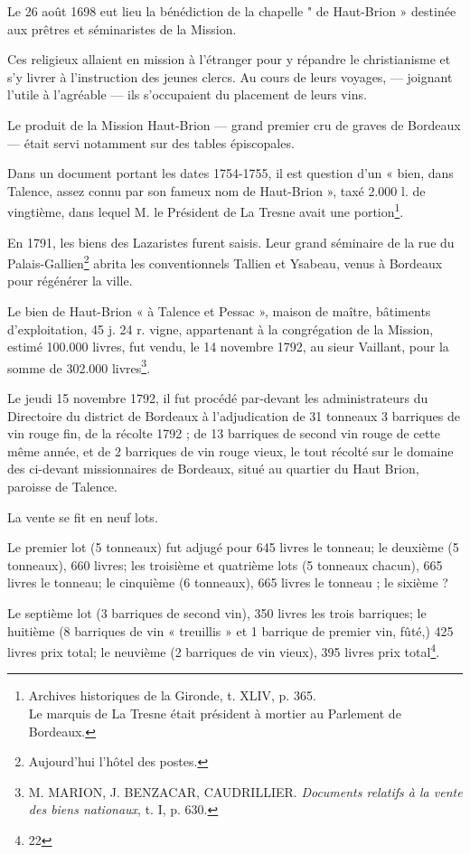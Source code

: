Le 26 août 1698 eut lieu la bénédiction de la chapelle " de Haut-Brion » destinée aux prêtres et séminaristes de la Mission.

Ces religieux allaient en mission à l'étranger pour y répandre le christianisme et s'y livrer à l'instruction des jeunes clercs. Au cours de leurs voyages, — joignant l'utile à l'agréable — ils s'occupaient du placement de leurs vins.

Le produit de la Mission Haut-Brion — grand premier cru de graves de Bordeaux — était servi notamment sur des tables épiscopales.

Dans un document portant les dates 1754-1755, il est question d'un « bien, dans Talence, assez connu par son fameux nom de Haut-Brion », taxé 2.000 l. de vingtième, dans lequel M. le Président de La Tresne avait une portion\footnote{Archives historiques de la Gironde, t. XLIV, p. 365.\\Le marquis de La Tresne était président à mortier au Parlement de Bordeaux.}.

En 1791, les biens des Lazaristes furent saisis. Leur grand séminaire de la rue du Palais-Gallien\footnote{Aujourd'hui l'hôtel des postes.} abrita les conventionnels Tallien et Ysabeau, venus à Bordeaux pour régénérer la ville.

Le bien de Haut-Brion « à Talence et Pessac », maison de maître, bâtiments d'exploitation, 45 j. 24 r. vigne, appartenant à la congrégation de la Mission, estimé 100.000 livres, fut vendu, le 14 novembre 1792, au sieur Vaillant, pour la somme de 302.000 livres\footnote{M. MARION, J. BENZACAR, CAUDRILLIER. \textit{Documents relatifs à la vente des biens nationaux}, t. I, p. 630.}.

Le jeudi 15 novembre 1792, il fut procédé par-devant les administrateurs du Directoire du district de Bordeaux à l'adjudication de 31 tonneaux 3 barriques de vin rouge fin, de la récolte 1792 ; de 13 barriques de second vin rouge de cette même année, et de 2 barriques de vin rouge vieux, le tout récolté sur le domaine des ci-devant missionnaires de Bordeaux, situé au quartier du Haut Brion, paroisse de Talence.

La vente se fit en neuf lots.

Le premier lot (5 tonneaux) fut adjugé pour 645 livres le tonneau; le deuxième (5 tonneaux), 660 livres; les troisième et quatrième lots (5 tonneaux chacun), 665 livres le tonneau; le cinquième (6 tonneaux), 665 livres le tonneau ; le sixième ?

Le septième lot (3 barriques de second vin), 350 livres les trois barriques; le huitième (8 barriques de vin « treuillis » et 1 barrique de premier vin, fûté,) 425 livres prix total; le neuvième (2 barriques de vin vieux), 395 livres prix total\footnote{22}.

